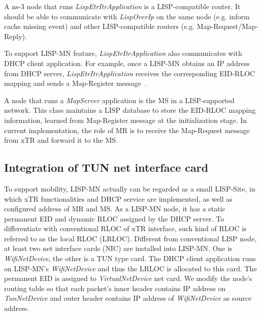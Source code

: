 A ns-3 node that runs \emph{LispEtrItrApplication} is a LISP-compatible router. It should be able to communicate with \emph{LispOverIp} on the same node (e.g. inform cache missing event) and other LISP-compatible routers (e.g. Map-Request/Map-Reply). 
 
 To support LISP-MN feature, \emph{LispEtrItrApplication} also communicates with DHCP client application. For example, once a LISP-MN obtains an IP address from DHCP server, \emph{LispEtrItrApplication} receives the corresponding EID-RLOC mapping and sends a Map-Register message~\cite{meyer-lisp-mn-16}.

A node that runs a \emph{MapServer} application is the MS in a LISP-supported network. This class maintains a LISP database to store the EID-RLOC mapping information, learned from Map-Register message at the initialization stage. In current implementation, the role of MR is to receive the Map-Request message from xTR and forward it to the MS.

\subsection{Integration of TUN net interface card}
\label{subsec:tundevice}
To support mobility, LISP-MN actually can be regarded as a small LISP-Site, in which xTR functionalities and DHCP service are implemented, as well as configured address of MR and MS. As a LISP-MN node, it has a static permanent EID and dynamic RLOC assigned by the DHCP server. To differentiate with conventional RLOC of xTR interface, such kind of RLOC is referred to as the local RLOC (LRLOC). Different from conventional LISP node, at least two net interface cards (NIC) are installed into LISP-MN. One is \emph{WifiNetDevice}, the other is a TUN type card. The DHCP client application runs on LISP-MN's \emph{WifiNetDevice} and thus the LRLOC is allocated to this card. The permanent EID is assigned to \emph{VirtualNetDevice} net card. We modify the node's routing table so that each packet's inner header contains IP address on \emph{TunNetDevice} and outer header contains IP address of \emph{WifiNetDevice} as source address.

